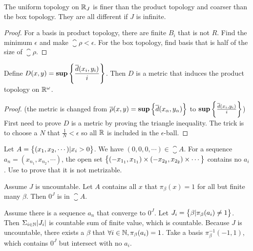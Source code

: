 \begin{theorem}
The uniform topology on $\mathbb{R}_{J}$ is finer than the product topology and coarser than the box topology. They are all different if $J$ is infinite.
\end{theorem}
\begin{proof}
    For a basis in product topology, there are finite $B_i$ that is not $R$. Find the minimum $\epsilon$ and make $\closure{\rho} < \epsilon$. For the box topology, find basis that is half of the size of $\closure{\rho}$.
\end{proof}



\begin{theorem}
    Define $\displaystyle D(x,y) = \mathbf{sup} \set{\frac{\overline{d}(x_i, y_i )}{i}} $. Then $D$ is a metric that induces the product topology on $\mathbb{R}^\omega$.
\end{theorem}
\begin{proof}
    (the metric is changed from $\overline{\rho}(x,y) = \mathbf{sup} \set{ \overline{d}(x_{\alpha}, y_{\alpha})} $ to $\mathbf{sup} \set{\frac{\overline{d}(x_i, y_i )}{i}} $) First need to prove $D$ is a metric by proving the triangle inequality. The trick is to choose a $N$ that $\frac{1}{N} < \epsilon$ so all $\mathbb{R}$ is included in the $\epsilon$-ball.
\end{proof}


\begin{example}
    Let $A = \set{(x_1, x_2, \cdots ) | x_i > 0}$. We have $(0,0,0, \cdots) \in \closure{A}$. For a sequence $a_n = (x_{n_1}, x_{n_2}, \cdots)$, the open set $\set{(- x_{1_1}, x_{1_1}) \times (- x_{2_2}, x_{2_2}) \times \cdots}$ contains no $a_i$. Use  to prove that it is not metrizable.
\end{example}


\begin{example}
    Assume $J$ is uncountable. Let $A$ contains all $x$ that $\pi_{\beta}(x) = 1$ for all but finite many $\beta$. Then $0^J$ is in $\closure{A}$.
    
    Assume there is a sequence $a_n$ that converge to $0^J$. Let $J_i = \set{\beta | \pi_\beta (a_i) \neq 1 }$. Then $\Sigma_{i\in \mathbb{N}} \abs{J_i}$ is countable sum of finite value, which is countable. Because $J$ is uncountable, there exists a $\beta$ that $\forall i \in \mathbb{N}, \pi_\beta (a_i) = 1$. Take a basis $\pi_{\beta}^{-1}(-1,1)$, which contains $0^J$ but intersect with no $a_i$.
\end{example}


